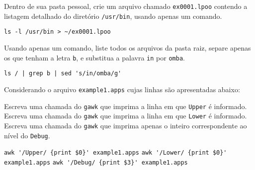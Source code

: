 %
%
%

\begin{Exercise}[label={0001},difficulty={0},origin={coreutils}]
  Dentro de sua pasta pessoal, crie um arquivo chamado \lstinline+ex0001.lpoo+
  contendo a listagem detalhado do diretório \lstinline+/usr/bin+, usando apenas um
  comando. 
\end{Exercise}
\begin{Answer}[ref={0001}]
\begin{lstlisting}
ls -l /usr/bin > ~/ex0001.lpoo
\end{lstlisting}
\end{Answer}

\begin{Exercise}[label={0002},difficulty={1},origin={coreutils}]
  Usando apenas um comando, liste todos os arquivos da pasta raiz, separe apenas
  os que tenham a letra \lstinline+b+, e substitua a palavra \lstinline+in+ por
  \lstinline+omba+.
\end{Exercise}
\begin{Answer}[ref={0002}]
\begin{lstlisting}
ls / | grep b | sed 's/in/omba/g'
\end{lstlisting}
\end{Answer}

\begin{Exercise}[label={0003}, difficulty={0}, origin={gawk}]
  Considerando o arquivo \lstinline+example1.apps+ cujas linhas são
  apresentadas abaixo:
  
    \Question Escreva uma chamada do \lstinline+gawk+ que imprima a linha em que
      \lstinline+Upper+ é informado.
    \Question Escreva uma chamada do \lstinline+gawk+ que imprima a linha em que
      \lstinline+Lower+ é informado.
    \Question Escreva uma chamada do \lstinline+gawk+ que imprima apenas o inteiro
      correspondente ao nível do \lstinline+Debug+.
\end{Exercise}
\begin{Answer}[ref={0003}]
  \Question \lstinline+awk '/Upper/ {print $0}' example1.apps+
  \Question \lstinline+awk '/Lower/ {print $0}' example1.apps+
  \Question \lstinline+awk '/Debug/ {print $3}' example1.apps+
\end{Answer}

